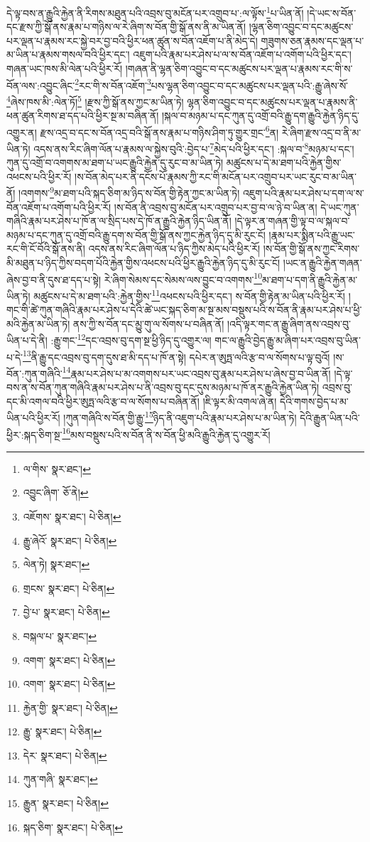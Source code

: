 དེ་ལྟ་བས་ན་རྒྱུའི་རྐྱེན་ནི་རིགས་མཐུན་པའི་འབྲས་བུ་མངོན་པར་འགྲུབ་པ་:ལ་ལྟོས་\footnote{ལ་གིས་  སྣར་ཐང་། }པ་ཡིན་ནོ། །དེ་ཡང་ས་བོན་དང་རྫས་ཀྱི་སྒོ་ནས་རྣམ་པ་གཉིས་ལ་རེ་ཞིག་ས་བོན་གྱི་སྒོ་ནས་ནི་མ་ཡིན་ནོ། །ལྷན་ཅིག་འབྱུང་བ་དང་མཚུངས་པར་ལྡན་པ་རྣམས་རང་སྐྱེ་བར་བྱ་བའི་ཕྱིར་ཕན་ཚུན་ས་བོན་འཇོག་པ་ནི་མེད་དེ། གཟུགས་ཅན་རྣམས་དང་ལྡན་པ་མ་ཡིན་པ་རྣམས་གསལ་བའི་ཕྱིར་དང་། འཇུག་པའི་རྣམ་པར་ཤེས་པ་ལ་ས་བོན་འཇོག་པ་འགོག་པའི་ཕྱིར་དང་། གཞན་ཡང་ཁས་མི་ལེན་པའི་ཕྱིར་རོ། །གཞན་ནི་ལྷན་ཅིག་འབྱུང་བ་དང་མཚུངས་པར་ལྡན་པ་རྣམས་རང་གི་ས་བོན་ལས་:འབྱུང་ཞིང་\footnote{འབྱུང་ཞིག་  ཅོ་ནེ། }རང་གི་ས་བོན་འཇོག་\footnote{འཇོགས་  སྣར་ཐང་།  པེ་ཅིན། }པས་ལྷན་ཅིག་འབྱུང་བ་དང་མཚུངས་པར་ལྡན་པའི་:རྒྱུ་ཞེས་སོ་\footnote{རྒྱུ་ཞེའོ་  སྣར་ཐང་།  པེ་ཅིན། }ཞེས་ཁས་མི་:ལེན་ཏོ།\footnote{ལེན་ཏེ།  སྣར་ཐང་། } །རྫས་ཀྱི་སྒོ་ནས་ཀྱང་མ་ཡིན་ཏེ། ལྷན་ཅིག་འབྱུང་བ་དང་མཚུངས་པར་ལྡན་པ་རྣམས་ནི་ཕན་ཚུན་རིགས་ཐ་དད་པའི་ཕྱིར་སྔ་མ་བཞིན་ནོ། །སྐལ་བ་མཉམ་པ་དང་ཀུན་དུ་འགྲོ་བའི་རྒྱུ་དག་རྒྱུའི་རྐྱེན་ཉིད་དུ་འགྱུར་ན། རྫས་འདྲ་བ་དང་ས་བོན་འདྲ་བའི་སྒོ་ནས་རྣམ་པ་གཉིས་ཤིག་ཏུ་གྱུར་གྲང་\footnote{གྲངས་  སྣར་ཐང་།  པེ་ཅིན། }ན། རེ་ཞིག་རྫས་འདྲ་བ་ནི་མ་ཡིན་ཏེ། འདས་ནས་རིང་ཞིག་ལོན་པ་རྣམས་ལ་སྐྱེས་བུའི་:བྱེད་པ་\footnote{བྱེ་པ་  སྣར་ཐང་།  པེ་ཅིན། }མེད་པའི་ཕྱིར་དང་། :སྐལ་བ་\footnote{བསྐལ་པ་  སྣར་ཐང་། }མཉམ་པ་དང་། ཀུན་དུ་འགྲོ་བ་འགགས་མ་ཐག་པ་ཡང་རྒྱུའི་རྐྱེན་དུ་རུང་བ་མ་ཡིན་ཏེ། མཚུངས་པ་དེ་མ་ཐག་པའི་རྐྱེན་གྱིས་འཕངས་པའི་ཕྱིར་རོ། །ས་བོན་མེད་པར་ནི་དངོས་པོ་རྣམས་ཀྱི་རང་གི་མངོན་པར་འགྲུབ་པར་ཡང་རུང་བ་མ་ཡིན་ནོ། །འགགས་\footnote{འགག་  སྣར་ཐང་།  པེ་ཅིན། }མ་ཐག་པའི་སྐད་ཅིག་མ་ཉིད་ས་བོན་གྱི་རྟེན་ཀྱང་མ་ཡིན་ཏེ། འཇུག་པའི་རྣམ་པར་ཤེས་པ་དག་ལ་ས་བོན་འཇོག་པ་འགོག་པའི་ཕྱིར་རོ། །ས་བོན་ནི་འབྲས་བུ་མངོན་པར་འགྲུབ་པར་བྱ་བ་ལ་ཉེ་བ་ཡིན་ན། དེ་ཡང་ཀུན་གཞིའི་རྣམ་པར་ཤེས་པ་ཁོ་ན་ལ་སྲིད་པས་དེ་ཁོ་ན་རྒྱུའི་རྐྱེན་ཉིད་ཡིན་ནོ། །དེ་ལྟར་ན་གཞན་གྱི་ལྟ་བ་ལ་སྐལ་བ་མཉམ་པ་དང་ཀུན་དུ་འགྲོ་བའི་རྒྱུ་དག་ས་བོན་གྱི་སྒོ་ནས་ཀྱང་རྐྱེན་ཉིད་དུ་མི་རུང་ངོ། །རྣམ་པར་སྨིན་པའི་རྒྱུ་ཡང་རང་གི་ངོ་བོའི་སྒོ་ནས་ནི། འདས་ནས་རིང་ཞིག་ལོན་པ་ཉིད་ཀྱིས་མེད་པའི་ཕྱིར་རོ། །ས་བོན་གྱི་སྒོ་ནས་ཀྱང་རིགས་མི་མཐུན་པ་ཉིད་ཀྱིས་བདག་པོའི་རྐྱེན་གྱིས་འཕངས་པའི་ཕྱིར་རྒྱུའི་རྐྱེན་ཉིད་དུ་མི་རུང་ངོ། །ཡང་ན་རྒྱུའི་རྐྱེན་གཞན་ཞེས་བྱ་བ་ནི་དུས་ཐ་དད་པ་སྟེ། རེ་ཞིག་སེམས་དང་སེམས་ལས་བྱུང་བ་འགགས་\footnote{འགག་  སྣར་ཐང་།  པེ་ཅིན། }མ་ཐག་པ་དག་ནི་རྒྱུའི་རྐྱེན་མ་ཡིན་ཏེ། མཚུངས་པ་དེ་མ་ཐག་པའི་:རྐྱེན་གྱིས་\footnote{རྐྱེན་གྱི་  སྣར་ཐང་།  པེ་ཅིན། }འཕངས་པའི་ཕྱིར་དང་། ས་བོན་གྱི་རྟེན་མ་ཡིན་པའི་ཕྱིར་རོ། །གང་གི་ཚེ་ཀུན་གཞིའི་རྣམ་པར་ཤེས་པ་དེའི་ཚེ་ཡང་སྐད་ཅིག་མ་སྔ་མས་བསྡུས་པའི་ས་བོན་ནི་རྣམ་པར་ཤེས་པ་ཕྱི་མའི་རྐྱེན་མ་ཡིན་ཏེ། ནས་ཀྱི་ས་བོན་དང་མྱུ་གུ་ལ་སོགས་པ་བཞིན་ནོ། །འདི་ལྟར་གང་ན་རྒྱུ་ཞིག་ནས་འབྲས་བུ་ཡིན་པ་དེ་ནི། :རྒྱུ་གང་\footnote{རྒྱུ་  སྣར་ཐང་།  པེ་ཅིན། }དང་འབྲས་བུ་དག་སྔ་ཕྱི་ཉིད་དུ་འགྱུར་ལ། གང་ལ་རྒྱུའི་བྱེད་རྒྱུ་མ་ཞིག་པར་འབྲས་བུ་ཡིན་པ་དེ་\footnote{དེར་  སྣར་ཐང་།  པེ་ཅིན། }ནི་རྒྱུ་དང་འབྲས་བུ་དག་དུས་ཐ་མི་དད་པ་ཁོ་ན་སྟེ། དཔེར་ན་ཨུཏྤ་ལའི་རྩ་བ་ལ་སོགས་པ་ལྟ་བུའོ། །ས་བོན་:ཀུན་གཞིའི་\footnote{ཀུན་གཞི་  སྣར་ཐང་། }རྣམ་པར་ཤེས་པ་མ་འགགས་པར་ཡང་འབྲས་བུ་རྣམ་པར་ཤེས་པ་ཞེས་བྱ་བ་ཡིན་ནོ། །དེ་ལྟ་བས་ན་ས་བོན་ཀུན་གཞིའི་རྣམ་པར་ཤེས་པ་ནི་འབྲས་བུ་དང་དུས་མཉམ་པ་ཁོ་ནར་རྒྱུའི་རྐྱེན་ཡིན་ཏེ། འབྲས་བུ་དང་མི་འགལ་བའི་ཕྱིར་ཨུཏྤ་ལའི་རྩ་བ་ལ་སོགས་པ་བཞིན་ནོ། །ཇི་ལྟར་མི་འགལ་ཞེ་ན། དེའི་གགས་བྱེད་པ་མ་ཡིན་པའི་ཕྱིར་རོ། །ཀུན་གཞིའི་ས་བོན་གྱི་རྒྱུ་\footnote{རྒྱུན་  སྣར་ཐང་།  པེ་ཅིན། }ཉིད་ནི་འཇུག་པའི་རྣམ་པར་ཤེས་པ་མ་ཡིན་ཏེ། དེའི་རྒྱུན་ཡིན་པའི་ཕྱིར་:སྐད་ཅིག་སྔ་\footnote{སྐད་ཅིག་  སྣར་ཐང་།  པེ་ཅིན། }མས་བསྡུས་པའི་ས་བོན་ནི་ས་བོན་ཕྱི་མའི་རྒྱུའི་རྐྱེན་དུ་འགྱུར་རོ། 